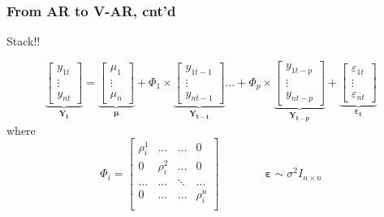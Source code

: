 \documentclass{beamer}
\begin{document}
	\begin{frame}
		\frametitle{From AR to V-AR, cnt'd}
		Stack!!
		\begin{center}
			$$\underbrace{\begin{bmatrix}
				y_{1t}\\
				\vdots\\
				y_{nt}
			\end{bmatrix}}_{\bm{Y_{t}}} = \underbrace{\begin{bmatrix}
			\mu_{1}\\
			\vdots\\
			\mu_{n}
			\end{bmatrix}}_{\bm{\mu}} + \Phi_{1}\times \underbrace{\begin{bmatrix}
			y_{1t-1}\\
			\vdots\\
			y_{nt-1}
			\end{bmatrix}}_{\bm{Y_{t-1}}}\dots  + \Phi_{p} \times \underbrace{\begin{bmatrix}
			y_{1t-p}\\
			\vdots\\
			y_{nt-p}
			\end{bmatrix}}_{\bm{Y_{t-p}}} + \underbrace{\begin{bmatrix}
			\varepsilon_{1t}\\
			\vdots\\
			\varepsilon_{nt}
			\end{bmatrix}}_{\bm{\varepsilon_{t}}}$$ 
		where 
		$$\Phi_{i} = \begin{bmatrix}
		\rho_{i}^{1} & \dots & \dots & 0\\
		0 & \rho_{i}^{2} & \dots & 0 \\		
		\dots & \dots & \ddots & \dots\\
		0 & \dots & \dots & \rho_{i}^{n}\\			
		\end{bmatrix} \hspace{4em} \bm{\varepsilon}\sim \sigma^{2}I_{n\times n}$$
		\end{center}	
	\end{frame}	
	
\end{document}
